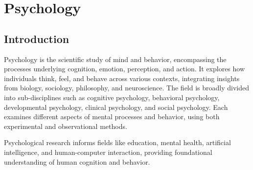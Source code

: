 \chapter{Psychology}
\thispagestyle{fancy}

\section{Introduction}

Psychology is the scientific study of mind and behavior, encompassing the processes underlying cognition, emotion, perception, and action. It explores how individuals think, feel, and behave across various contexts, integrating insights from biology, sociology, philosophy, and neuroscience. The field is broadly divided into sub-disciplines such as cognitive psychology, behavioral psychology, developmental psychology, clinical psychology, and social psychology. Each examines different aspects of mental processes and behavior, using both experimental and observational methods.

Psychological research informs fields like education, mental health, artificial intelligence, and human-computer interaction, providing foundational understanding of human cognition and behavior.
